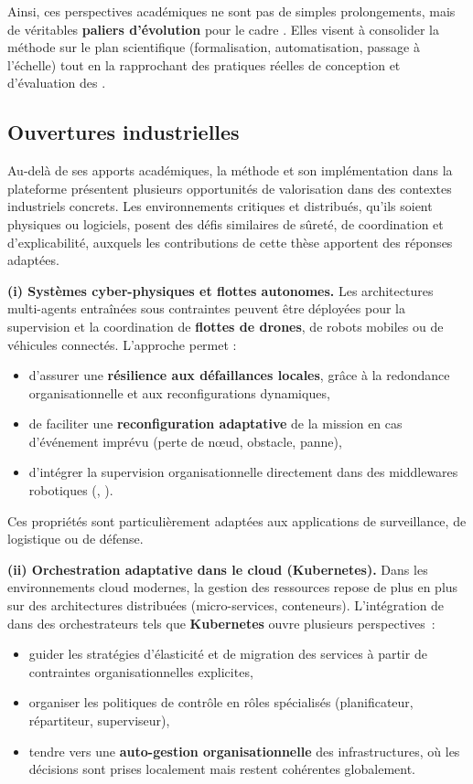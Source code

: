 \medskip
\noindent
Ainsi, ces perspectives académiques ne sont pas de simples prolongements, mais de véritables \textbf{paliers d'évolution} pour le cadre .
Elles visent à consolider la méthode sur le plan scientifique (formalisation, automatisation, passage à l'échelle) tout en la rapprochant des pratiques réelles de conception et d'évaluation des .

\subsection*{Ouvertures industrielles}

Au-delà de ses apports académiques, la méthode  et son implémentation dans la plateforme  présentent plusieurs opportunités de valorisation dans des contextes industriels concrets.
Les environnements critiques et distribués, qu'ils soient physiques ou logiciels, posent des défis similaires de sûreté, de coordination et d'explicabilité, auxquels les contributions de cette thèse apportent des réponses adaptées.

\medskip
\noindent
\textbf{(i) Systèmes cyber-physiques et flottes autonomes.}
Les architectures multi-agents entraînées sous contraintes peuvent être déployées pour la supervision et la coordination de \textbf{flottes de drones}, de robots mobiles ou de véhicules connectés.
L'approche  permet :
\begin{itemize}
  \item d'assurer une \textbf{résilience aux défaillances locales}, grâce à la redondance organisationnelle et aux reconfigurations dynamiques,
  \item de faciliter une \textbf{reconfiguration adaptative} de la mission en cas d'événement imprévu (perte de nœud, obstacle, panne),
  \item d'intégrer la supervision organisationnelle directement dans des middlewares robotiques (, ).
\end{itemize}
Ces propriétés sont particulièrement adaptées aux applications de surveillance, de logistique ou de défense.

\medskip
\noindent
\textbf{(ii) Orchestration adaptative dans le cloud (Kubernetes).}
Dans les environnements cloud modernes, la gestion des ressources repose de plus en plus sur des architectures distribuées (micro-services, conteneurs).
L'intégration de  dans des orchestrateurs tels que \textbf{Kubernetes} ouvre plusieurs perspectives~:
\begin{itemize}
  \item guider les stratégies d'élasticité et de migration des services à partir de contraintes organisationnelles explicites,
  \item organiser les politiques de contrôle en rôles spécialisés (planificateur, répartiteur, superviseur),
  \item tendre vers une \textbf{auto-gestion organisationnelle} des infrastructures, où les décisions sont prises localement mais restent cohérentes globalement.
\end{itemize}

